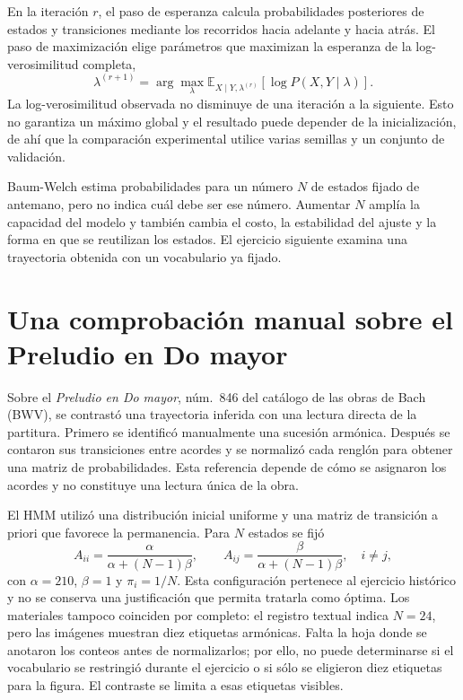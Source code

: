 En la iteración $r$, el paso de esperanza calcula probabilidades posteriores de estados y transiciones mediante los recorridos hacia adelante y hacia atrás. El paso de maximización elige parámetros que maximizan la esperanza de la log-verosimilitud completa,
\[
\lambda^{(r+1)}
=
\arg\max_{\lambda}
\mathbb{E}_{X\mid Y,\lambda^{(r)}}
\left[\log P(X,Y\mid\lambda)\right].
\]
La log-verosimilitud observada no disminuye de una iteración a la siguiente. Esto no garantiza un máximo global y el resultado puede depender de la inicialización, de ahí que la comparación experimental utilice varias semillas y un conjunto de validación.

Baum-Welch estima probabilidades para un número $N$ de estados fijado de antemano, pero no indica cuál debe ser ese número. Aumentar $N$ amplía la capacidad del modelo y también cambia el costo, la estabilidad del ajuste y la forma en que se reutilizan los estados. El ejercicio siguiente examina una trayectoria obtenida con un vocabulario ya fijado.

\section{Una comprobación manual sobre el Preludio en Do mayor}

Sobre el \emph{Preludio en Do mayor}, núm.~846 del catálogo de las obras de Bach (BWV), se contrastó una trayectoria inferida con una lectura directa de la partitura. Primero se identificó manualmente una sucesión armónica. Después se contaron sus transiciones entre acordes y se normalizó cada renglón para obtener una matriz de probabilidades. Esta referencia depende de cómo se asignaron los acordes y no constituye una lectura única de la obra.

El HMM utilizó una distribución inicial uniforme y una matriz de transición a priori que favorece la permanencia. Para $N$ estados se fijó
\begin{equation}
A_{ii}
=
\frac{\alpha}{\alpha+(N-1)\beta},
\qquad
A_{ij}
=
\frac{\beta}{\alpha+(N-1)\beta},
\quad i\neq j,
\label{eq:transicion-alpha-beta}
\end{equation}
con $\alpha=210$, $\beta=1$ y $\pi_i=1/N$. Esta configuración pertenece al ejercicio histórico y no se conserva una justificación que permita tratarla como óptima. Los materiales tampoco coinciden por completo: el registro textual indica $N=24$, pero las imágenes muestran diez etiquetas armónicas. Falta la hoja donde se anotaron los conteos antes de normalizarlos; por ello, no puede determinarse si el vocabulario se restringió durante el ejercicio o si sólo se eligieron diez etiquetas para la figura. El contraste se limita a esas etiquetas visibles.

